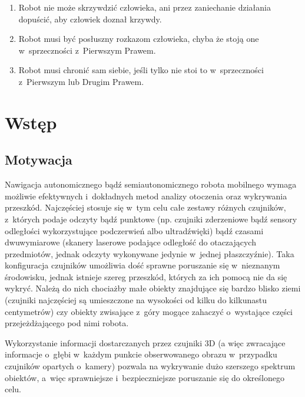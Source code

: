 

\begin{savequote}[90mm]
\begin{enumerate}
\item Robot nie może skrzywdzić człowieka, ani przez zaniechanie działania dopuścić, aby człowiek doznał krzywdy.\\
\item Robot musi być posłuszny rozkazom człowieka, chyba że stoją one w~sprzeczności z~Pierwszym Prawem.\\
\item Robot musi chronić sam siebie, jeśli tylko nie stoi to w~sprzeczności z~Pierwszym lub Drugim Prawem.\end{enumerate}
\end{savequote}


\chapter{Wstęp}
\label{chap:wstep}

\section{Motywacja}

Nawigacja autonomicznego bądź semiautonomicznego robota mobilnego wymaga możliwie
efektywnych i~dokładnych metod analizy otoczenia oraz wykrywania przeszkód.
Najczęściej stosuje się w~tym celu całe zestawy różnych czujników, z~których
podaje odczyty bądź punktowe (np. czujniki zderzeniowe bądź sensory odległości
wykorzystujące podczerwień albo ultradźwięki) bądź czasami dwuwymiarowe (skanery
laserowe podające odległość do otaczających przedmiotów, jednak odczyty wykonywane
jedynie w~jednej płaszczyźnie). Taka konfiguracja czujników umożliwia dość sprawne
poruszanie się w~nieznanym środowisku, jednak istnieje szereg przeszkód, których za
ich pomocą nie da się wykryć. Należą do nich chociażby małe obiekty znajdujące
się bardzo blisko ziemi (czujniki najczęściej są umieszczone na wysokości od kilku
do kilkunastu centymetrów) czy obiekty zwisające z~góry mogące zahaczyć o~wystające
części przejeżdżającego pod nimi robota.

Wykorzystanie informacji dostarczanych przez czujniki 3D (a więc zwracające informacje
o~głębi w~każdym punkcie obserwowanego obrazu w~przypadku czujników opartych o~kamery)
pozwala na wykrywanie dużo szerszego spektrum obiektów, a~więc sprawniejsze i~bezpieczniejsze
poruszanie się do określonego celu.

